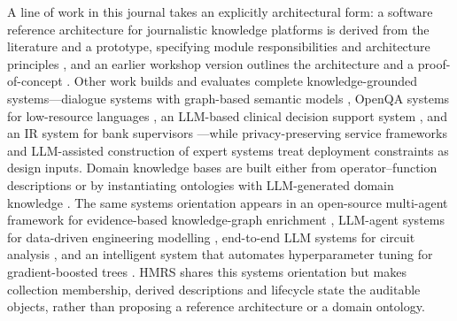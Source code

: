 A line of work in this journal takes an explicitly architectural form: a
software reference architecture for journalistic knowledge platforms is
derived from the literature and a prototype, specifying module
responsibilities and architecture principles \citep{ocaa2023software}, and an
earlier workshop version outlines the architecture and a proof-of-concept
\citep{gallofr2021jkpdesign}. Other work builds and evaluates complete
knowledge-grounded systems---dialogue systems with graph-based semantic
models \citep{yang2024building}, OpenQA systems for low-resource languages
\citep{budur2024building}, an LLM-based clinical decision support system
\citep{vito2025heliot}, and an IR system for bank supervisors
\citep{aarab2024system}---while privacy-preserving service frameworks
\citep{liao2026practical} and LLM-assisted construction of expert systems
\citep{garridomer2026gofai} treat deployment constraints as design inputs.
Domain knowledge bases are built either from operator--function descriptions
\citep{hou2025method} or by instantiating ontologies with LLM-generated domain
knowledge \citep{ciatto2025large}. The same systems orientation appears in an
open-source multi-agent framework for evidence-based knowledge-graph enrichment
\citep{mohamed2026orchestra}, LLM-agent systems for data-driven engineering
modelling \citep{liu2026automatin}, end-to-end LLM systems for circuit analysis
\citep{chen2026enhancing}, and an intelligent system that automates
hyperparameter tuning for gradient-boosted trees \citep{sorokin2023sigopt}.
HMRS shares this systems orientation but
makes collection membership, derived descriptions and lifecycle state the
auditable objects, rather than proposing a reference architecture or a domain
ontology.

